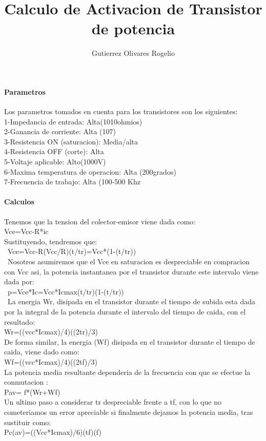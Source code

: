 \documentclass[12pt,a4paper]{report}
\author{Gutierrez Olivares Rogelio}
\title{Calculo de Activacion de Transistor de potencia}
\begin{document}
\maketitle
\paragraph{Parametros}
Los parametros tomados en cuenta para los transistores son los siguientes:\\
1-Impedancia de entrada: Alta(1010ohmios)
\\
2-Ganancia de corriente: Alta (107)
\\
3-Resistencia ON (saturacion): Media/alta
\\
4-Resistencia OFF (corte): Alta
\\
5-Voltaje aplicable: Alto(1000V)
\\
6-Maxima temperatura de operacion: Alta (200grados) 
\\
7-Frecuencia de trabajo: Alta (100-500 Khz

\paragraph{Calculos}
\begin{center}
Tenemos que la tension del colector-emisor viene dada como:\\
Vce=Vcc-R*ic\\
Sustituyendo, tendremos que:
\\\
Vce=Vcc-R(Vcc/R)(t/tr)=Vcc*(1-(t/tr))
\\\
Nosotros asumiremos que el Vce en saturacion es despreciable en compracion con Vcc asi, la potencia instantanea por el transistor durante este intervalo viene dada por:\\\
p=Vce*Ic=Vcc*Icmax(t/tr)(1-(t/tr))\\\
La energia Wr, disipada en el transistor durante el tiempo de subida esta dada por la integral de la potencia durante el intervalo del tiempo de caida, con el resultado:\\
Wr=((vcc*Icmax)/4)((2tr)/3)
\\
De forma similar, la energia (Wf) disipada en el transistor durante el tiempo de caida, viene dado como:
\\
Wf=((vcc*Icmax)/4)((2tf)/3)\\
La potencia media resultante dependeria de la frecuencia con que se efectue la conmutacion :
\\
Pav= f*(Wr+Wf)\\
Un ultimo paso a considerar tr despreciable frente a tf, con lo que no cometeriamos un error apreciable si finalmente dejamos la potencia media, tras sustituir como:
\\
Pc(av)=((Vcc*Icmax)/6)(tf)(f)

\end{center}
\end{document}
